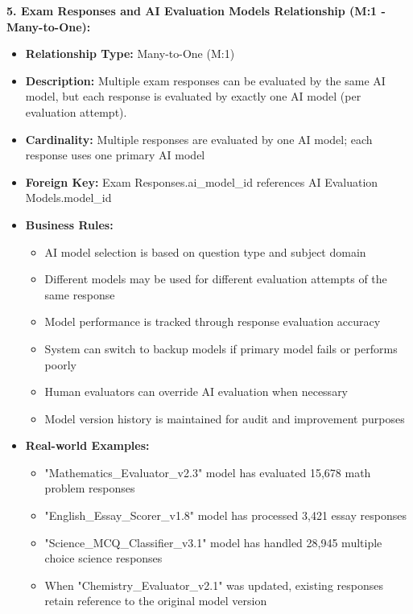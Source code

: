\documentclass[12pt,a4paper,oneside]{book}
\begin{document}
\textbf{5. Exam Responses and AI Evaluation Models Relationship (M:1 - Many-to-One):}
\begin{itemize}
    \item \textbf{Relationship Type:} Many-to-One (M:1)
    \item \textbf{Description:} Multiple exam responses can be evaluated by the same AI model, but each response is evaluated by exactly one AI model (per evaluation attempt).
    \item \textbf{Cardinality:} Multiple responses are evaluated by one AI model; each response uses one primary AI model
    \item \textbf{Foreign Key:} Exam Responses.ai\_model\_id references AI Evaluation Models.model\_id
    \item \textbf{Business Rules:}
        \begin{itemize}
            \item AI model selection is based on question type and subject domain
            \item Different models may be used for different evaluation attempts of the same response
            \item Model performance is tracked through response evaluation accuracy
            \item System can switch to backup models if primary model fails or performs poorly
            \item Human evaluators can override AI evaluation when necessary
            \item Model version history is maintained for audit and improvement purposes
        \end{itemize}
    \item \textbf{Real-world Examples:}
        \begin{itemize}
            \item "Mathematics\_Evaluator\_v2.3" model has evaluated 15,678 math problem responses
            \item "English\_Essay\_Scorer\_v1.8" model has processed 3,421 essay responses
            \item "Science\_MCQ\_Classifier\_v3.1" model has handled 28,945 multiple choice science responses
            \item When "Chemistry\_Evaluator\_v2.1" was updated, existing responses retain reference to the original model version
        \end{itemize}
\end{itemize}
\end{document}
